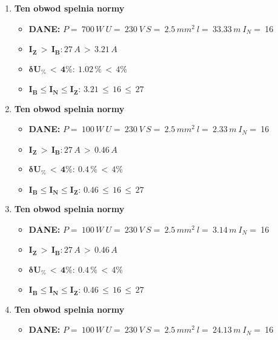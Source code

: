 \begin{enumerate}
\begin{itemize}
\end{itemize}
\item \textcolor{Green}{\cmark} \textbf{Ten obwod spelnia normy} 
\begin{itemize}
\item[] \textbf{DANE: } \: $ P = \:700\, W\: U = \:230\: V\: S = \:2.5\, mm^2\: l = \:33.33\, m\: I_N= \: $16
\item[\textcolor{Green}{\cmark}] $ \pmb{I_Z \, >  \, I_B: }27 \, A \, > \,3.21 \, A $
\item[\textcolor{Green}{\cmark}] $ \pmb{ \delta U_\% \, < \, 4\%:} \:1.02 \, \% \,< \, 4\% $
\item[\textcolor{Green}{\cmark}] $ \pmb{I_B \le I_N \le I_Z: } \, 3.21 \, \le \,16 \, \le \,27 $
\end{itemize}
\item \textcolor{Green}{\cmark} \textbf{Ten obwod spelnia normy} 
\begin{itemize}
\item[] \textbf{DANE: } \: $ P = \:100\, W\: U = \:230\: V\: S = \:2.5\, mm^2\: l = \:2.33\, m\: I_N= \: $16
\item[\textcolor{Green}{\cmark}] $ \pmb{I_Z \, >  \, I_B: }27 \, A \, > \,0.46 \, A $
\item[\textcolor{Green}{\cmark}] $ \pmb{ \delta U_\% \, < \, 4\%:} \:0.4 \, \% \,< \, 4\% $
\item[\textcolor{Green}{\cmark}] $ \pmb{I_B \le I_N \le I_Z: } \, 0.46 \, \le \,16 \, \le \,27 $
\end{itemize}
\item \textcolor{Green}{\cmark} \textbf{Ten obwod spelnia normy} 
\begin{itemize}
\item[] \textbf{DANE: } \: $ P = \:100\, W\: U = \:230\: V\: S = \:2.5\, mm^2\: l = \:3.14\, m\: I_N= \: $16
\item[\textcolor{Green}{\cmark}] $ \pmb{I_Z \, >  \, I_B: }27 \, A \, > \,0.46 \, A $
\item[\textcolor{Green}{\cmark}] $ \pmb{ \delta U_\% \, < \, 4\%:} \:0.4 \, \% \,< \, 4\% $
\item[\textcolor{Green}{\cmark}] $ \pmb{I_B \le I_N \le I_Z: } \, 0.46 \, \le \,16 \, \le \,27 $
\end{itemize}
\item \textcolor{Green}{\cmark} \textbf{Ten obwod spelnia normy} 
\begin{itemize}
\item[] \textbf{DANE: } \: $ P = \:100\, W\: U = \:230\: V\: S = \:2.5\, mm^2\: l = \:24.13\, m\: I_N= \: $16

\end{itemize}
\end{enumerate}
